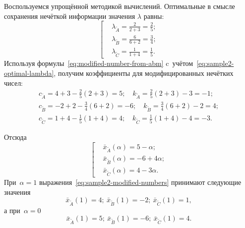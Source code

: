 Воспользуемся упрощённой методикой вычислений. Оптимальные в смысле сохранения нечёткой информации значения $\lambda$ равны:
\begin{equation}
\label{eq:sample2-optimal-lambda}
  \left[ \begin{aligned}
    & \lambda_{\tilde A}=\frac{2}{2+3}=\frac{2}{5}; \\ 
    & \lambda_{\tilde B}=\frac{6}{6+2}=\frac{3}{4}; \\ 
    & \lambda_{\tilde C}=\frac{1}{1+4}=\frac{1}{5}.
  \end{aligned} \right.
\end{equation}
Используя формулы~\eqref{eq:modified-number-from-abm} c~учётом~\eqref{eq:sample2-optimal-lambda}, получим коэффициенты для модифицированных нечётких чисел:
\begin{gather*}
  c_{\tilde A}=4+3-\frac{2}{5}\left( 2+3 \right)=5;\quad k_{\tilde A}=\frac{2}{5}\left( 2+3 \right)-3=-1; \\ 
  c_{\tilde B}=-2+2-\frac{3}{4}\left( 6+2 \right)=-6;\quad k_{\tilde B}=\frac{3}{4}\left( 6+2 \right)-2=4; \\ 
  c_{\tilde C}=1+4-\frac{1}{5}\left( 1+4 \right)=4;\quad k_{\tilde C}=\frac{1}{5}\left( 1+4 \right)-4=-3.
\end{gather*}

Отсюда
\begin{equation}
\label{eq:sample2-modified-numbers}
  \left[ \begin{aligned}
    & \bar{x}_{\tilde A}\left( \alpha  \right)=5-\alpha;  \\ 
    & \bar{x}_{\tilde B}\left( \alpha  \right)=-6+4\alpha;  \\ 
    & \bar{x}_{\tilde C}\left( \alpha  \right)=4-3\alpha.
  \end{aligned} \right.
\end{equation}
При~$\alpha=1$ выражения~\eqref{eq:sample2-modified-numbers} принимают следующие значения
\begin{equation*}
  \bar{x}_{\tilde A}\left( 1 \right)=4;\ \bar{x}_{\tilde B}\left( 1 \right)=-2;\ \bar{x}_{\tilde C}\left( 1 \right)=1,
\end{equation*}
а при~$\alpha=0$
\begin{equation*}
  \bar{x}_{\tilde A}\left( 1 \right)=5;\ \bar{x}_{\tilde B}\left( 1 \right)=-6;\ \bar{x}_{\tilde C}\left( 1 \right)=4.
\end{equation*}

